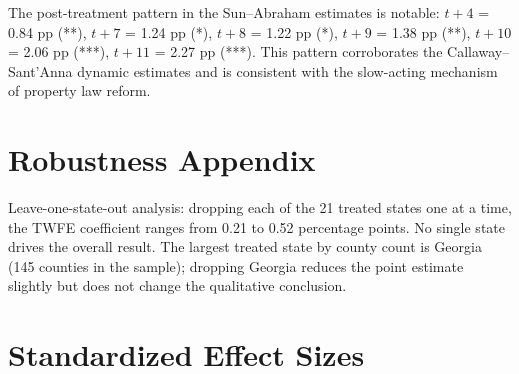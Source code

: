 \documentclass[12pt]{article}
\begin{document}
The post-treatment pattern in the Sun--Abraham estimates is notable: $t+4$ = 0.84 pp (**), $t+7$ = 1.24 pp (*), $t+8$ = 1.22 pp (*), $t+9$ = 1.38 pp (**), $t+10$ = 2.06 pp (***), $t+11$ = 2.27 pp (***). This pattern corroborates the Callaway--Sant'Anna dynamic estimates and is consistent with the slow-acting mechanism of property law reform.

\section{Robustness Appendix}

Leave-one-state-out analysis: dropping each of the 21 treated states one at a time, the TWFE coefficient ranges from 0.21 to 0.52 percentage points. No single state drives the overall result. The largest treated state by county count is Georgia (145 counties in the sample); dropping Georgia reduces the point estimate slightly but does not change the qualitative conclusion.

\section{Standardized Effect Sizes}
\label{sec:sde}


\end{document}
